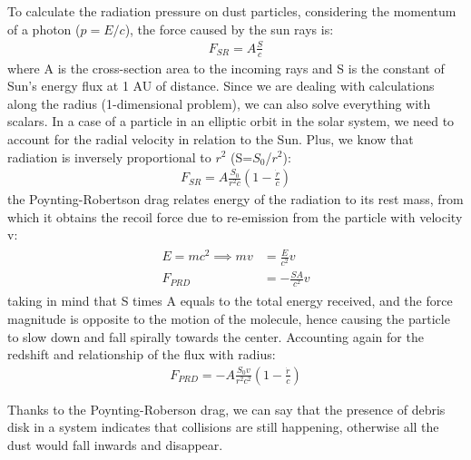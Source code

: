 \documentclass[12pt,a4paper]{article}
\begin{document}
To calculate the radiation pressure on dust particles, considering the momentum of a photon ($p=E/c$), the force caused by the sun rays is:
\begin{align}
    F_{SR}=A\frac{S}{c}
\end{align}
where A is the cross-section area to the incoming rays and S is the constant of Sun's energy flux at 1 AU of distance. Since we are dealing with calculations along the radius (1-dimensional problem), we can also solve everything with scalars. In a case of a particle in an elliptic orbit in the solar system, we need to account for the radial velocity in relation to the Sun. Plus, we know that radiation is inversely proportional to $r^2$ (S=$S_0$/$r^2$):
\begin{align}
\label{44}
    F_{SR}=A\frac{S_0}{r^2c}(1-\frac{\dot{r}}{c})
\end{align}
the Poynting-Robertson drag relates energy of the radiation to its rest mass, from which it obtains the recoil force due to re-emission from the particle with velocity v:
\begin{align}
\begin{split}
    E=mc^2\implies mv&=\frac{E}{c^2}v \\
    F_{PRD}&=-\frac{SA}{c^2}v
\end{split}
\end{align}
taking in mind that S times A equals to the total energy received, and the force magnitude is opposite to the motion of the molecule, hence causing the particle to slow down and fall spirally towards the center. Accounting again for the redshift and relationship of the flux with radius:
\begin{align}
\label{46}
    F_{PRD}=-A\frac{S_0v}{r^2c^2}(1-\frac{\dot{r}}{c})
\end{align}

Thanks to the Poynting-Roberson drag, we can say that the presence of debris disk in a system indicates that collisions are still happening, otherwise all the dust would fall inwards and disappear.
\end{document}
